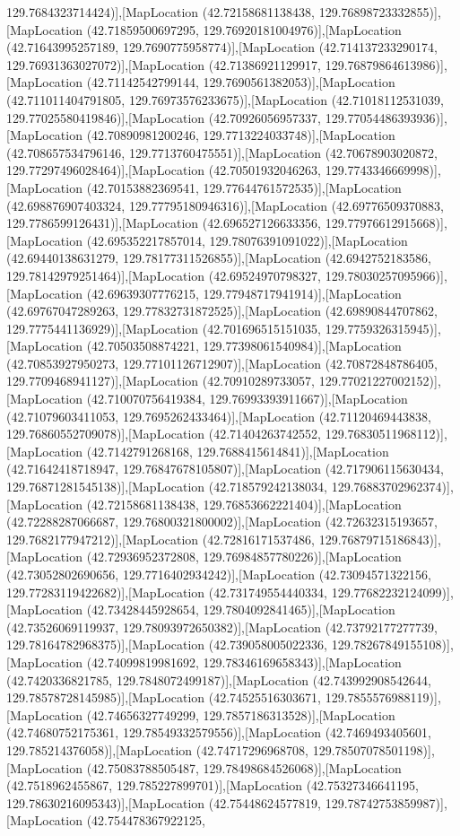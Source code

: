 129.7684323714424)],[MapLocation (42.72158681138438, 129.76898723332855)],[MapLocation (42.71859500697295, 129.76920181004976)],[MapLocation (42.71643995257189, 129.7690775958774)],[MapLocation (42.714137233290174, 129.76931363027072)],[MapLocation (42.71386921129917, 129.76879864613986)],[MapLocation (42.71142542799144, 129.7690561382053)],[MapLocation (42.711011404791805, 129.76973576233675)],[MapLocation (42.71018112531039, 129.77025580419846)],[MapLocation (42.70926056957337, 129.77054486393936)],[MapLocation (42.70890981200246, 129.7713224033748)],[MapLocation (42.708657534796146, 129.7713760475551)],[MapLocation (42.70678903020872, 129.77297496028464)],[MapLocation (42.70501932046263, 129.7743346669998)],[MapLocation (42.70153882369541, 129.77644761572535)],[MapLocation (42.698876907403324, 129.77795180946316)],[MapLocation (42.69776509370883, 129.7786599126431)],[MapLocation (42.696527126633356, 129.77976612915668)],[MapLocation (42.695352217857014, 129.78076391091022)],[MapLocation (42.69440138631279, 129.78177311526855)],[MapLocation (42.6942752183586, 129.78142979251464)],[MapLocation (42.69524970798327, 129.78030257095966)],[MapLocation (42.69639307776215, 129.77948717941914)],[MapLocation (42.69767047289263, 129.77832731872525)],[MapLocation (42.69890844707862, 129.7775441136929)],[MapLocation (42.701696515151035, 129.7759326315945)],[MapLocation (42.70503508874221, 129.77398061540984)],[MapLocation (42.70853927950273, 129.77101126712907)],[MapLocation (42.70872848786405, 129.7709468941127)],[MapLocation (42.70910289733057, 129.77021227002152)],[MapLocation (42.710070756419384, 129.76993393911667)],[MapLocation (42.71079603411053, 129.7695262433464)],[MapLocation (42.71120469443838, 129.76860552709078)],[MapLocation (42.71404263742552, 129.76830511968112)],[MapLocation (42.7142791268168, 129.7688415614841)],[MapLocation (42.71642418718947, 129.76847678105807)],[MapLocation (42.717906115630434, 129.76871281545138)],[MapLocation (42.718579242138034, 129.76883702962374)],[MapLocation (42.72158681138438, 129.76853662221404)],[MapLocation (42.72288287066687, 129.76800321800002)],[MapLocation (42.72632315193657, 129.7682177947212)],[MapLocation (42.72816171537486, 129.76879715186843)],[MapLocation (42.72936952372808, 129.76984857780226)],[MapLocation (42.73052802690656, 129.7716402934242)],[MapLocation (42.73094571322156, 129.77283119422682)],[MapLocation (42.731749554440334, 129.77682232124099)],[MapLocation (42.73428445928654, 129.7804092841465)],[MapLocation (42.73526069119937, 129.78093972650382)],[MapLocation (42.73792177277739, 129.78164782968375)],[MapLocation (42.739058005022336, 129.78267849155108)],[MapLocation (42.74099819981692, 129.78346169658343)],[MapLocation (42.7420336821785, 129.7848072499187)],[MapLocation (42.743992908542644, 129.78578728145985)],[MapLocation (42.74525516303671, 129.7855576988119)],[MapLocation (42.74656327749299, 129.7857186313528)],[MapLocation (42.74680752175361, 129.78549332579556)],[MapLocation (42.7469493405601, 129.785214376058)],[MapLocation (42.74717296968708, 129.78507078501198)],[MapLocation (42.75083788505487, 129.78498684526068)],[MapLocation (42.7518962455867, 129.785227899701)],[MapLocation (42.75327346641195, 129.78630216095343)],[MapLocation (42.75448624577819, 129.78742753859987)],[MapLocation (42.754478367922125, 